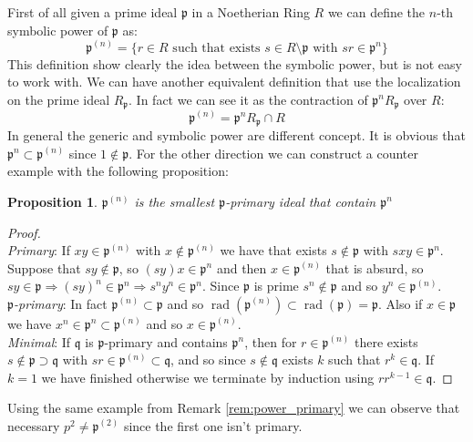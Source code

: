 \documentclass[notitlepage, a4]{book}
\theoremstyle{plain}
\newtheorem{prop}[teo]{Proposition}
\theoremstyle{remark}
\theoremstyle{definition}
\newcommand{\p}{\mathfrak{p}}
\newcommand{\q}{\mathfrak{q}}
\DeclareMathOperator{\rad}{rad}
\newcounter{que}
\begin{document}
%	
%		
	First of all given a prime ideal $ \p $ in a Noetherian Ring $ R $ we can define the $ n $-th symbolic power of $ \p $ as:
	\begin{equation}\label{eq:sym_pow_p1}
		\p^{(n)} = \{ r \in R \text{ such that exists } s \in R \setminus \p \text{ with } sr \in \p^n \}
	\end{equation}
	This definition show clearly the idea between the symbolic power, but is not easy to work with. We can have another equivalent definition that use the localization on the prime ideal $ R_\p $. In fact we can see it as the contraction of $ \p^n R_\p $ over $ R $:
	\begin{equation}\label{eq:sym_pow_p2}
		\p^{(n)} = \p^n R_\p \cap R
	\end{equation}
	In general the generic and symbolic power are different concept. It is obvious that $ \p^{n} \subset \p^{(n)} $ since $ 1 \not \in \p $. For the other direction we can construct a counter example with the following proposition:
	\begin{prop}\label{prop:sym_is_primary}
		$ \p^{(n)} $ is the smallest $ \p $-primary ideal that contain $ \p^n $
	\end{prop}
	\begin{proof}\quad \\
		\textit{Primary}: If $ xy \in  \p^{(n)}$ with $ x \not \in  \p^{(n)}$ we have that exists $ s \not \in \p $ with $ sxy \in \p^n $. Suppose that $ sy \not \in \p $, so $ (sy)x \in \p^n $ and then $ x \in \p^{(n)} $ that is absurd, so $ sy \in \p \Rightarrow (sy)^n \in \p^n \Rightarrow s^n y^n \in \p^n$. Since $ \p $ is prime $ s^n \not \in \p $ and so $ y^n \in \p^{(n)} $. \\
		\textit{$\p$-primary}: In fact $ \p^{(n)} \subset \p $ and so $  \rad  (\p^{(n)} )\subset \rad (\p) = \p$. Also if $ x \in \p $ we have $ x^n \in \p^n \subset \p^{(n)}  $ and so $ x \in \p^{(n)}  $.\\
		\textit{Minimal}: If $ \q $ is $ \p $-primary and contains $ \p^n $, then for $ r \in \p^{(n)}  $ there exists $ s \not \in \p \supset \q $ with $ sr \in \p^{(n)}  \subset \q $, and so since $ s \not \in \q  $ exists $ k $ such that $ r^k \in \q $. If $ k=1 $ we have finished otherwise we terminate by induction using $ r r^{k-1} \in \q $.
	\end{proof}
	Using the same example from Remark \ref{rem:power_primary} we can observe that necessary $ p^2 \neq \p^{(2)}  $ since the first one isn't primary. 
	
\end{document}
